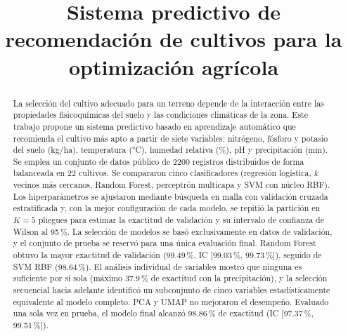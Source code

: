 \documentclass[conference]{IEEEtran}
\begin{document}
\title{Sistema predictivo de recomendación de cultivos para la optimización agrícola}

\author{
\and
{}
\and
{}
}

\maketitle


\begin{abstract}
La selección del cultivo adecuado para un terreno depende de la interacción entre las propiedades fisicoquímicas del suelo y las condiciones climáticas de la zona. Este trabajo propone un sistema predictivo basado en aprendizaje automático que recomienda el cultivo más apto a partir de siete variables: nitrógeno, fósforo y potasio del suelo (kg/ha), temperatura (°C), humedad relativa (\%), pH y precipitación (mm). Se emplea un conjunto de datos público de 2200 registros distribuidos de forma balanceada en 22 cultivos. Se compararon cinco clasificadores (regresión logística, $k$ vecinos más cercanos, Random Forest, perceptrón multicapa y SVM con núcleo RBF). Los hiperparámetros se ajustaron mediante búsqueda en malla con validación cruzada estratificada y, con la mejor configuración de cada modelo, se repitió la partición en $K=5$ pliegues para estimar la exactitud de validación y su intervalo de confianza de Wilson al 95\,\%. La selección de modelos se basó exclusivamente en datos de validación, y el conjunto de prueba se reservó para una única evaluación final. Random Forest obtuvo la mayor exactitud de validación (99.49\,\%, IC [99.03\,\%, 99.73\,\%]), seguido de SVM RBF (98.64\,\%). El análisis individual de variables mostró que ninguna es suficiente por sí sola (máximo 37.9\,\% de exactitud con la precipitación), y la selección secuencial hacia adelante identificó un subconjunto de cinco variables estadísticamente equivalente al modelo completo. PCA y UMAP no mejoraron el desempeño. Evaluado una sola vez en prueba, el modelo final alcanzó 98.86\,\% de exactitud (IC [97.37\,\%, 99.51\,\%]).
\end{abstract}
\end{document}
